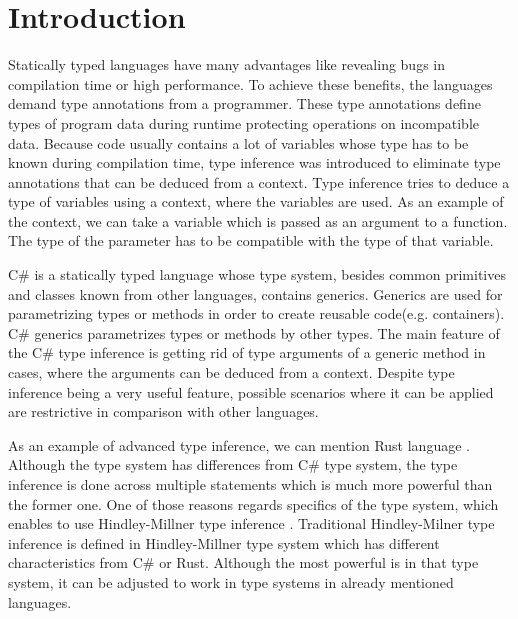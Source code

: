 \chapter*{Introduction}

Statically typed languages have many advantages like revealing bugs in compilation time or high performance.
To achieve these benefits, the languages demand type annotations from a programmer.
These type annotations define types of program data during runtime protecting operations on incompatible data.
Because code usually contains a lot of variables whose type has to be known during compilation time, type inference was introduced to eliminate type annotations that can be deduced from a context.
Type inference tries to deduce a type of variables using a context, where the variables are used.
As an example of the context, we can take a variable which is passed as an argument to a function. 
The type of the parameter has to be compatible with the type of that variable.
\par
{}
C\# is a statically typed language whose type system, besides common primitives and classes known from other languages, contains generics.
Generics are used for parametrizing types or methods in order to create reusable code(e.g. containers).
C\# generics parametrizes types or methods by other types.
The main feature of the C\# type inference is getting rid of type arguments of a generic method in cases, where the arguments can be deduced from a context.
Despite type inference being a very useful feature, possible scenarios where it can be applied are restrictive in comparison with other languages.
\par
{}
As an example of advanced type inference, we can mention Rust language \cite{online:rustTypeInference}.
Although the type system has differences from C\# type system, the type inference is done across multiple statements which is much more powerful than the former one.
One of those reasons regards specifics of the type system, which enables to use Hindley-Millner type inference \cite{online:yHM}.
Traditional Hindley-Milner type inference is defined in Hindley-Millner type system \cite{online:wikiHM} which has different characteristics from C\# or Rust.
Although the most powerful is in that type system, it can be adjusted to work in type systems in already mentioned languages.
